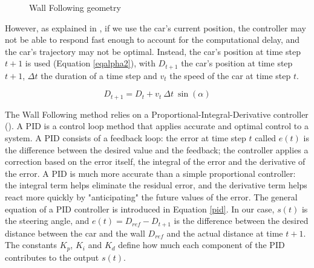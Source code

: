 \begin{figure}[H]
\caption{Wall Following geometry}
\label{walllidar}
\end{figure}

However, as explained in \cite{wallfollowcourse}, if we use the car's current position, the controller may not be able to respond fast enough to account for the computational delay, and the car's trajectory may not be optimal. Instead, the car's position at time step $t+1$ is used (Equation \ref{eqalpha2}), with $D_{t+1}$ the car's position at time step $t+1$, $\Delta t $ the duration of a time step and $v_t$ the speed of the car at time step $t$.
 
 \begin{equation}
 \label{eqalpha2}
  D_{t+1} = D_t + v_t \: \Delta t \: \sin(\alpha)
 \end{equation}

The Wall Following method relies on a Proportional-Integral-Derivative controller (\cite{rivera1986internal}). A PID is a control loop method that applies accurate and optimal control to a system. A PID consists of a feedback loop: the error at time step $t$ called $e(t)$ is the difference between the desired value and the feedback; the controller applies a correction based on the error itself, the integral of the error and the derivative of the error. A PID is much more accurate than a simple proportional controller: the integral term helps eliminate the residual error, and the derivative term helps react more quickly by "anticipating" the future values of the error. \newline
The general equation of a PID controller is introduced in Equation \ref{pid}. In our case, $s(t)$ is the steering angle, and $e(t) = D_{ref} - D_{t+1} $ is the difference between the desired distance between the car and the wall $D_{ref}$ and the actual distance at time $t+1$. The constants $K_p$, $K_i$ and $K_d$ define how much each component of the PID contributes to the output $s(t)$. 

